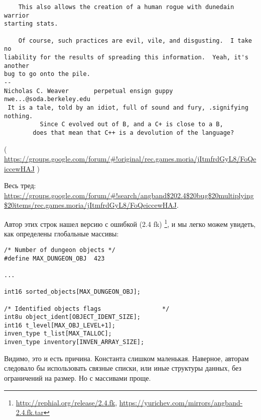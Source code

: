 \begin{lstlisting}
	This also allows the creation of a human rogue with dunedain warrior
starting stats.

	Of course, such practices are evil, vile, and disgusting.  I take no
liability for the results of spreading this information.  Yeah, it's another
bug to go onto the pile.
-- 
Nicholas C. Weaver       perpetual ensign guppy      nwe...@soda.berkeley.edu
 It is a tale, told by an idiot, full of sound and fury, .signifying nothing.
          Since C evolved out of B, and a C+ is close to a B,
        does that mean that C++ is a devolution of the language?
\end{lstlisting}
( \url{https://groups.google.com/forum/#!original/rec.games.moria/jItmfrdGyL8/FoQeiccewHAJ} )

Весь тред: \url{https://groups.google.com/forum/#!search/angband$202.4$20bug$20multiplying$20items/rec.games.moria/jItmfrdGyL8/FoQeiccewHAJ}.

Автор этих строк нашел версию с ошибкой (2.4 fk)
\footnote{\url{http://rephial.org/release/2.4.fk}, \url{https://yurichev.com/mirrors/angband-2.4.fk.tar}},
и мы легко можем увидеть, как определены глобальные массивы:

\begin{lstlisting}
/* Number of dungeon objects */
#define MAX_DUNGEON_OBJ  423

...

int16 sorted_objects[MAX_DUNGEON_OBJ];

/* Identified objects flags					*/
int8u object_ident[OBJECT_IDENT_SIZE];
int16 t_level[MAX_OBJ_LEVEL+1];
inven_type t_list[MAX_TALLOC];
inven_type inventory[INVEN_ARRAY_SIZE];
\end{lstlisting}

Видимо, это и есть причина. Константа  слишком маленькая.
Наверное, авторам следовало бы использовать связные списки, или иные структуры данных, без ограничений на размер.
Но с массивами проще.


